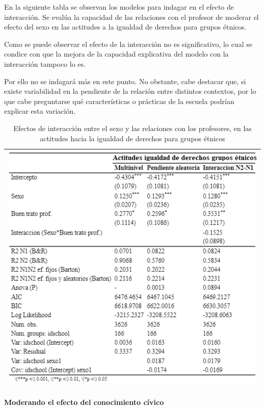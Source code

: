 \documentclass[12pt,twoside]{templates/facsothesis}
\begin{document}
En la siguiente tabla se observan los modelos para indagar en el efecto de interacción. Se evalúa la capacidad de las relaciones con el profesor de moderar el efecto del sexo en las actitudes a la igualdad de derechos para grupos étnicos.

Como se puede observar el efecto de la interacción no es significativo, lo cual se condice con que la mejora de la capacidad explicativa del modelo con la interacción tampoco lo es.

Por ello no se indagará más en este punto. No obstante, cabe destacar que, si existe variabilidad en la pendiente de la relación entre distintos contextos, por lo que cabe preguntarse qué características o prácticas de la escuela podrían explicar esta variación.

\begin{longtable}[]{@{}l@{}}
\caption{\label{tab:unnamed-chunk-15}Efectos de interacción entre el sexo y las relaciones con los profesores, en las actitudes hacia la igualdad de derechos para grupos étnicos}\tabularnewline
\toprule
\endhead
\includegraphics[width=\textwidth,height=0.7\textheight]{input/images/INTERACCION3.png} \\
\bottomrule
\end{longtable}

\hypertarget{moderando-el-efecto-del-conocimiento-cuxedvico-1}{%
\paragraph{Moderando el efecto del conocimiento cívico}\label{moderando-el-efecto-del-conocimiento-cuxedvico-1}}
\end{document}
